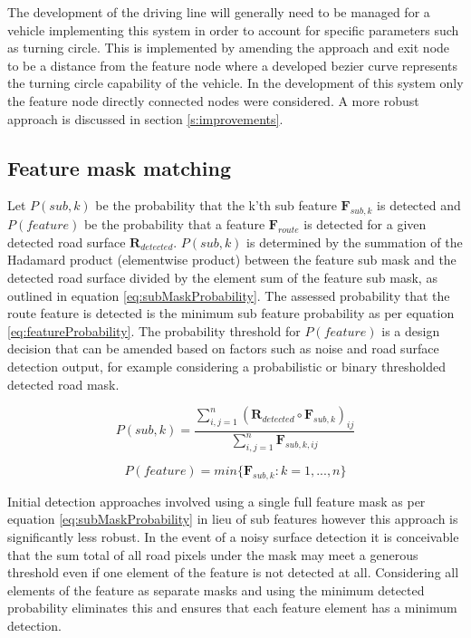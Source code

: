 \documentclass[]{aiaa-tc}%
\begin{document}
The development of the driving line will generally need to be managed for a vehicle implementing this system in order to account for specific parameters such as turning circle. This is implemented by amending the approach and exit node to be a distance from the feature node where a developed bezier curve represents the turning circle capability of the vehicle. In the development of this system only the feature node directly connected nodes were considered. A more robust approach is discussed in section \ref{s:improvements}.

\subsection{Feature mask matching} 

Let $P(sub,k)$ be the probability that the k'th sub feature $\textbf{F}_{sub,k}$ is detected and $P(feature)$ be the probability that a feature $\textbf{F}_{route}$ is detected for a given detected road surface $\textbf{R}_{detected}$. $P(sub,k)$ is determined by the summation of the Hadamard product (elementwise product) between the feature sub mask and the detected road surface divided by the element sum of the feature sub mask, as outlined in equation \ref{eq:subMaskProbability}. The assessed probability that the route feature is detected is the minimum sub feature probability as per equation \ref{eq:featureProbability}. The probability threshold for $P(feature)$ is a design decision that can be amended based on factors such as noise and road surface detection output, for example considering a probabilistic or binary thresholded detected road mask.

\begin{equation}\label{eq:subMaskProbability}
	P(sub,k) = \frac{\sum_{i,j=1}^{n} (\textbf{R}_{detected} \circ \textbf{F}_{sub,k})_{ij}}{\sum_{i,j=1}^{n} \textbf{F}_{sub,k,ij}}
\end{equation}

\begin{equation}\label{eq:featureProbability}
	P(feature) = min\{\textbf{F}_{sub,k}:k=1,...,n\}
\end{equation}

Initial detection approaches involved using a single full feature mask as per equation \ref{eq:subMaskProbability} in lieu of sub features however this approach is significantly less robust. In the event of a noisy surface detection it is conceivable that the sum total of all road pixels under the mask may meet a generous threshold even if one element of the feature is not detected at all. Considering all elements of the feature as separate masks and using the minimum detected probability eliminates this and ensures that each feature element has a minimum detection. 
\end{document}
